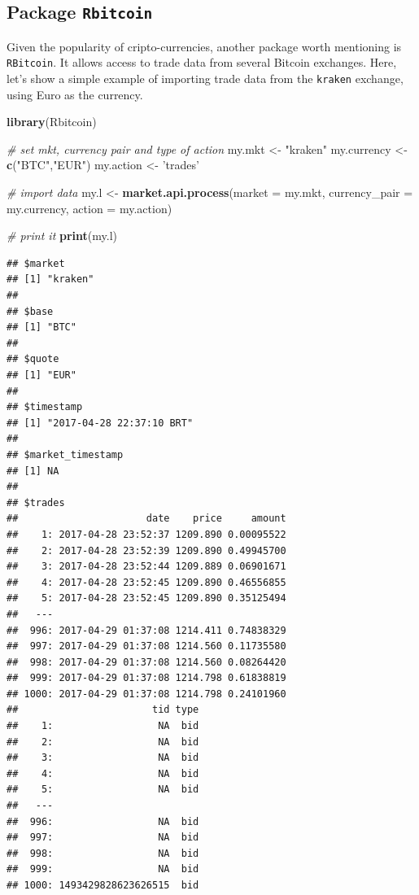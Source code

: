 \documentclass[11pt,]{book}
\newenvironment{Shaded}{\begin{snugshade}}{\end{snugshade}}
\newcommand{\KeywordTok}[1]{\textcolor[rgb]{0.27,0.27,0.27}{\textbf{#1}}}
\newcommand{\DataTypeTok}[1]{\textcolor[rgb]{0.27,0.27,0.27}{#1}}
\newcommand{\StringTok}[1]{\textcolor[rgb]{0.5,0.5,0.5}{#1}}
\newcommand{\CommentTok}[1]{\textcolor[rgb]{0.56,0.35,0.01}{\textit{#1}}}
\newcommand{\NormalTok}[1]{#1}
\begin{document}
\subsection{\texorpdfstring{Package
\texttt{Rbitcoin}}{Package Rbitcoin}}\label{package-rbitcoin}

Given the popularity of cripto-currencies, another package worth
mentioning is \texttt{RBitcoin}. It allows access to trade data from
several Bitcoin exchanges. Here, let's show a simple example of
importing trade data from the
\texttt{\textquotesingle{}kraken\textquotesingle{}} exchange, using Euro
as the currency.

\begin{Shaded}
\begin{Highlighting}[]
\KeywordTok{library}\NormalTok{(Rbitcoin)}

\CommentTok{# set mkt, currency pair and type of action}
\NormalTok{my.mkt <-}\StringTok{ "kraken"}
\NormalTok{my.currency <-}\StringTok{ }\KeywordTok{c}\NormalTok{(}\StringTok{"BTC"}\NormalTok{,}\StringTok{"EUR"}\NormalTok{)}
\NormalTok{my.action <-}\StringTok{ 'trades'}

\CommentTok{# import data}
\NormalTok{my.l <-}\StringTok{ }\KeywordTok{market.api.process}\NormalTok{(}\DataTypeTok{market =}\NormalTok{ my.mkt,}
                           \DataTypeTok{currency_pair =}\NormalTok{ my.currency,}
                           \DataTypeTok{action =}\NormalTok{ my.action)}

\CommentTok{# print it}
\KeywordTok{print}\NormalTok{(my.l)}
\end{Highlighting}
\end{Shaded}

\begin{verbatim}
## $market
## [1] "kraken"
## 
## $base
## [1] "BTC"
## 
## $quote
## [1] "EUR"
## 
## $timestamp
## [1] "2017-04-28 22:37:10 BRT"
## 
## $market_timestamp
## [1] NA
## 
## $trades
##                      date    price     amount
##    1: 2017-04-28 23:52:37 1209.890 0.00095522
##    2: 2017-04-28 23:52:39 1209.890 0.49945700
##    3: 2017-04-28 23:52:44 1209.889 0.06901671
##    4: 2017-04-28 23:52:45 1209.890 0.46556855
##    5: 2017-04-28 23:52:45 1209.890 0.35125494
##   ---                                        
##  996: 2017-04-29 01:37:08 1214.411 0.74838329
##  997: 2017-04-29 01:37:08 1214.560 0.11735580
##  998: 2017-04-29 01:37:08 1214.560 0.08264420
##  999: 2017-04-29 01:37:08 1214.798 0.61838819
## 1000: 2017-04-29 01:37:08 1214.798 0.24101960
##                       tid type
##    1:                  NA  bid
##    2:                  NA  bid
##    3:                  NA  bid
##    4:                  NA  bid
##    5:                  NA  bid
##   ---                         
##  996:                  NA  bid
##  997:                  NA  bid
##  998:                  NA  bid
##  999:                  NA  bid
## 1000: 1493429828623626515  bid
\end{verbatim}
\end{document}
